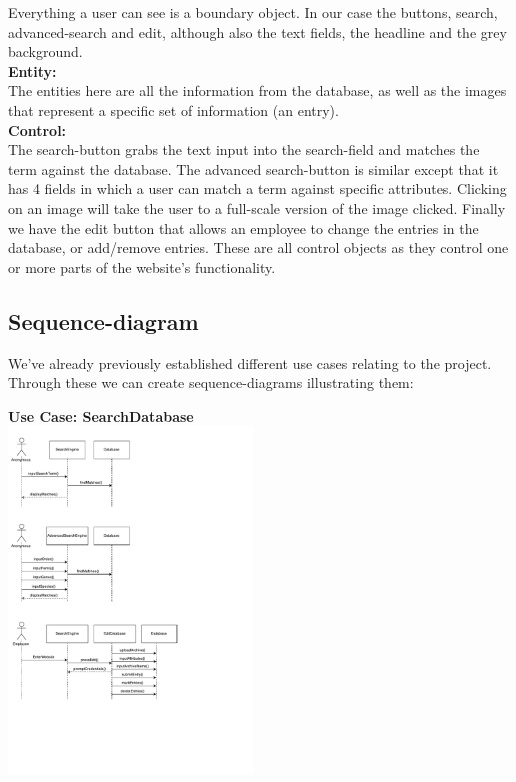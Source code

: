 \documentclass[12pt,a4paper]{article}
\begin{document}
Everything a user can see is a boundary object. In our case the buttons, search, advanced-search and edit, although also the text fields, the headline and the grey background.\\

\textbf{Entity:}\\

The entities here are all the information from the database, as well as the images that represent a specific set of information (an entry).\\

\textbf{Control:}\\

The search-button grabs the text input into the search-field and matches the term against the database.
The advanced search-button is similar except that it has 4 fields in which a user can match a term against specific attributes. 
Clicking on an image will take the user to a full-scale version of the image clicked.
Finally we have the edit button that allows an employee to change the entries in the database, or add/remove entries.
These are all control objects as they control one or more parts of the website's functionality.


\newpage
\subsection{Sequence-diagram}
We've already previously established different use cases relating to the project. Through these we can create sequence-diagrams illustrating them:

{\bf Use Case: SearchDatabase}\\

\includegraphics[height=92mm]{Sequence1.pdf}
\end{document}
